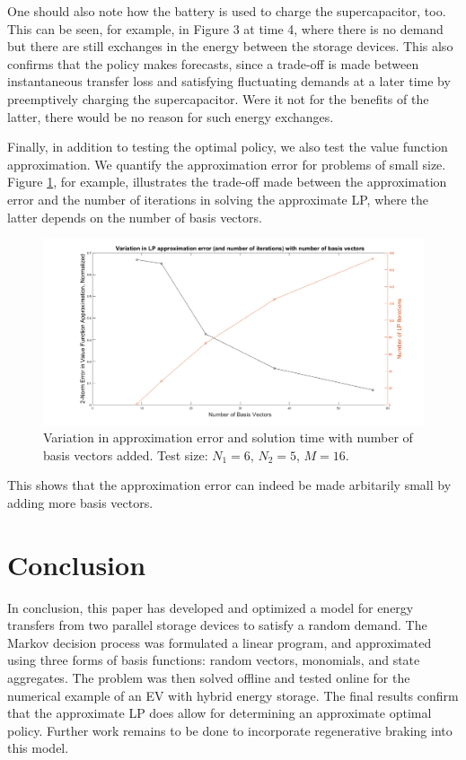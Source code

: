 \documentclass[conference]{IEEEtran}
\begin{document}
One should also note how the battery is used to charge the supercapacitor, too. This can be seen, for example, in Figure 3 at time 4, where there is no demand but there are still exchanges in the energy between the storage devices. This also confirms that the policy makes forecasts, since a trade-off is made between instantaneous transfer loss and satisfying fluctuating demands at a later time by preemptively charging the supercapacitor. Were it not for the benefits of the latter, there would be no reason for such energy exchanges.

Finally, in addition to testing the optimal policy, we also test the value function approximation. We quantify the approximation error for problems of small size. Figure \ref{fig:ApproxVsIter}, for example, illustrates the trade-off made between the approximation error and the number of iterations in solving the approximate LP, where the latter depends on the number of basis vectors. \begin{figure}[tbp]
\centerline{\includegraphics[scale=0.25]{ApproxErr_vs_NumIter.png}}
\caption{Variation in approximation error and solution time with number of basis vectors added. Test size: $N_{1}=6$, $N_{2}=5$, $M=16$.}
\label{fig:ApproxVsIter}
\end{figure} This shows that the approximation error can indeed be made arbitarily small by adding more basis vectors.



\section{Conclusion}
In conclusion, this paper has developed and optimized a model for energy transfers from two parallel storage devices to satisfy a random demand. The Markov decision process was formulated a linear program, and approximated using three forms of basis functions: random vectors, monomials, and state aggregates. The problem was then solved offline and tested online for the numerical example of an EV with hybrid energy storage. The final results confirm that the approximate LP does allow for determining an approximate optimal policy. Further work remains to be done to incorporate regenerative braking into this model.



\end{document}
